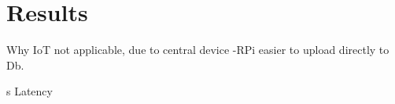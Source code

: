 \chapter{Results}

Why IoT not applicable, due to central device -RPi easier to upload directly to Db. 

s
Latency




